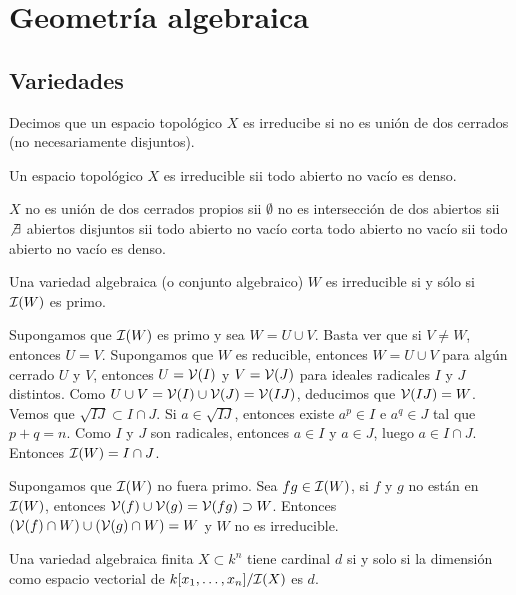 \documentclass[twoside]{report}
\begin{document}
\chapter{Geometría algebraica}
\section{Variedades}
\begin{defi}
Decimos que un espacio topológico $X$ es irreducibe si no es unión de dos cerrados (no necesariamente disjuntos).
\end{defi}

\begin{propi}
Un espacio topológico $X$ es irreducible sii todo abierto no vacío es denso.
\end{propi}

\begin{dem}
$X$ no es unión de dos cerrados propios sii $\emptyset$ no es intersección de dos abiertos sii $\not\exists$ abiertos disjuntos sii todo abierto no vacío corta todo abierto no vacío sii todo abierto no vacío es denso.
\end{dem}

\begin{propi}
Una variedad algebraica (o conjunto algebraico) $W$ es irreducible si y sólo si $\mathcal{I}(W)$ es primo.
\end{propi}
\begin{dem}
Supongamos que $\mathcal{I}(W)$ es primo y sea $W = U \cup V$. Basta ver que si $V \neq W$, entonces $U = V$.
Supongamos que $W$ es reducible, entonces $W = U \cup V$ para algún cerrado $U$ y $V$, entonces $U=\mathcal{V}(I)$ y $V=\mathcal{V}(J)$ para ideales radicales $I$ y $J$ distintos.
Como $U\cup V = \mathcal{V}(I)\cup\mathcal{V}(J) = \mathcal{V}(IJ)$, deducimos que $\mathcal{V}(IJ)=W$.
Vemos que $\sqrt{IJ}\subset I \cap J$.
Si $a \in \sqrt{IJ}$, entonces existe $a^p \in I$ e $a^q \in J$ tal que $p+q=n$.
Como $I$ y $J$ son radicales, entonces $a \in I$ y $a \in J$, luego $a \in I\cap J$.
Entonces $\mathcal{I}(W) = I \cap J$.

Supongamos que $\mathcal{I}(W)$ no fuera primo. Sea $fg \in \mathcal{I}(W)$, si $f$ y $g$ no están en $\mathcal{I}(W)$, entonces $\mathcal{V}(f)\cup\mathcal{V}(g)=\mathcal{V}(fg)\supset W$. Entonces $(\mathcal{V}(f) \cap W) \cup (\mathcal{V}(g) \cap W) = W$ y $W$ no es irreducible.
\end{dem}

\begin{lemma}
Una variedad algebraica finita $X\subset k^n$ tiene cardinal $d$ si y solo si la dimensión como espacio vectorial de $k[x_1,\dots,x_n]/\mathcal{I}(X)$ es $d$.
\end{lemma}
\end{document}

